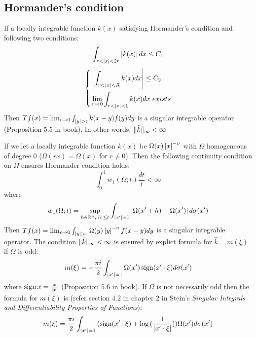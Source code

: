 \subsection{Hormander's condition}
If a locally integrable function $k(x)$ satisfying Hormander's condition and following two conditions:
\begin{equation*}
    \int_{r<\left\lvert x\right\rvert<2r}\left\lvert k(x)\right\rvert dx\leq C_1
\end{equation*}
\begin{equation*}
    \left\{
    \begin{aligned}
         & \left\lvert\int_{r<\left\lvert x\right\rvert<R}k(x)dx\right\rvert\leq C_2       \\
         & \lim_{r\to 0}\int_{r<\left\lvert x\right\rvert<1}k(x)dx~exists
    \end{aligned}
    \right.
\end{equation*}
Then $T f(x)=\lim_{\epsilon\to 0}\int_{\left\lvert y\right\rvert>\epsilon}k(x-y)f(y)dy$ is a singular integrable operator (Proposition 5.5 in book). In other words, $\lVert\hat{k}\rVert_\infty<\infty$\par
If we let a locally integrable function $k(x)$ be $\Omega(x)\left\lvert x\right\rvert^{-n}$ with $\Omega$ homogeneous of degree 0 ($\Omega(rx)=\Omega(x)$ for $r\neq 0$). Then the following continuity condition on $\Omega$ ensures Hormander condition holds:
\begin{equation*}
    \int_0^1{w_1(\Omega;t)\frac{dt}{t}<\infty}
\end{equation*}
where
\begin{equation*}
    w_1(\Omega;t)=\sup_{h\in\mathbb{R}^n, \left\lvert h\right\rvert\leq t}\int_{\left\lvert x'\right\rvert=1}{\left\lvert\Omega(x'+h)-\Omega{(x')}\right\rvert d\sigma(x')}
\end{equation*}
Then $T f(x)=\lim_{\epsilon\to 0}\int_{\left\lvert y\right\rvert>\epsilon}\Omega(y)\left\lvert y\right\rvert^{-n}f(x-y)d y$ is a singular integrable operator. The condition $\lVert\hat{k}\rVert_\infty<\infty$ is ensured by explict formula for $\hat{k}=m(\xi)$ if $\Omega$ is odd:
\begin{equation*}
    m(\xi)=-\frac{\pi i}{2}\int_{\left\lvert x'\right\rvert=1}\Omega(x')\operatorname{sign}(x'\cdot\xi)d\sigma(x')
\end{equation*}
where $\operatorname{sign} x=\frac{x}{\left\lvert x\right\rvert}$ (Proposition 5.6 in book). If $\Omega$ is not necessarily odd then the formula for $m(\xi)$ is (refer section 4.2 in chapter 2 in Stein's \emph{Singular Integrals and Differentiability Properties of Functions}):
\begin{equation*}
    m(\xi)=\frac{\pi i}{2}\int_{\left\lvert x'\right\rvert=1}{(\operatorname{sign}(x'\cdot\xi)+\log{(\frac{1}{\left\lvert x'\cdot\xi\right\rvert})})\Omega(x')d\sigma(x')}
\end{equation*}
